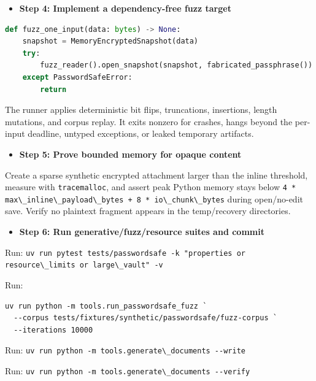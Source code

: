 \documentclass[
  letterpaper,
]{article}
\newcommand{\passthrough}[1]{#1}
\providecommand{\tightlist}{%
  \setlength{\itemsep}{0pt}\setlength{\parskip}{0pt}}
\begin{document}
\begin{itemize}
\tightlist
\item[$\square$]
  \textbf{Step 4: Implement a dependency-free fuzz target}
\end{itemize}

\begin{lstlisting}[language=Python]
def fuzz_one_input(data: bytes) -> None:
    snapshot = MemoryEncryptedSnapshot(data)
    try:
        fuzz_reader().open_snapshot(snapshot, fabricated_passphrase())
    except PasswordSafeError:
        return
\end{lstlisting}

The runner applies deterministic bit flips, truncations, insertions, length mutations, and corpus replay. It exits
nonzero for crashes, hangs beyond the per-input deadline, untyped exceptions, or leaked temporary artifacts.

\begin{itemize}
\tightlist
\item[$\square$]
  \textbf{Step 5: Prove bounded memory for opaque content}
\end{itemize}

Create a sparse synthetic encrypted attachment larger than the inline threshold, measure with \nolinkurl{tracemalloc},
and assert peak Python memory stays below
\passthrough{\lstinline!4 * max\_inline\_payload\_bytes + 8 * io\_chunk\_bytes!} during open/no-edit save. Verify no
plaintext fragment appears in the temp/recovery directories.

\begin{itemize}
\tightlist
\item[$\square$]
  \textbf{Step 6: Run generative/fuzz/resource suites and commit}
\end{itemize}

Run: \passthrough{\lstinline!uv run pytest tests/passwordsafe -k "properties or resource\_limits or large\_vault" -v!}

Run:

\begin{lstlisting}
uv run python -m tools.run_passwordsafe_fuzz `
  --corpus tests/fixtures/synthetic/passwordsafe/fuzz-corpus `
  --iterations 10000
\end{lstlisting}

Run: \passthrough{\lstinline!uv run python -m tools.generate\_documents --write!}

Run: \passthrough{\lstinline!uv run python -m tools.generate\_documents --verify!}
\end{document}
